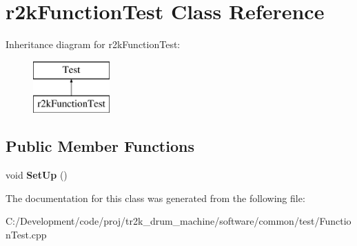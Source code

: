 \hypertarget{classr2k_function_test}{}\section{r2k\+Function\+Test Class Reference}
\label{classr2k_function_test}
Inheritance diagram for r2k\+Function\+Test\+:\begin{figure}[H]
\begin{center}
\leavevmode
\includegraphics[height=2.000000cm]{classr2k_function_test}
\end{center}
\end{figure}
\subsection*{Public Member Functions}
\begin{DoxyCompactItemize}
\item 
\mbox{\label{classr2k_function_test_af8cd5a24cf65c3c7a6b59d67db867b60}} 
void {\bfseries Set\+Up} ()
\end{DoxyCompactItemize}


The documentation for this class was generated from the following file\+:\begin{DoxyCompactItemize}
\item 
C\+:/\+Development/code/proj/tr2k\+\_\+drum\+\_\+machine/software/common/test/Function\+Test.\+cpp\end{DoxyCompactItemize}
